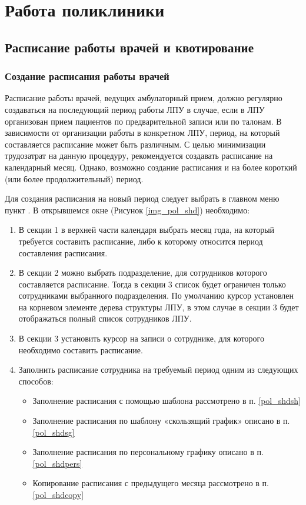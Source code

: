 \newpage
\section{Работа поликлиники}

\subsection{Расписание работы врачей и квотирование}

\subsubsection{Создание расписания работы врачей}

Расписание работы врачей, ведущих амбулаторный прием, должно регулярно создаваться на последующий период работы ЛПУ в случае, если в ЛПУ организован прием пациентов по предварительной записи или по талонам. В зависимости от организации работы в конкретном ЛПУ, период, на который составляется расписание может быть различным. С целью минимизации трудозатрат на данную процедуру, рекомендуется создавать расписание на календарный месяц. Однако, возможно создание расписания и на более короткий (или более продолжительный) период.

Для создания расписания на новый период следует выбрать в главном меню пункт . В открывшемся окне  (Рисунок \ref{img_pol_shd}) необходимо:
\begin{enumerate}
 \item В секции 1 в верхней части календаря выбрать месяц года, на который требуется составить расписание, либо к которому относится период составления расписания.
 \item В секции 2 можно выбрать подразделение, для сотрудников которого составляется расписание. Тогда в секции 3 список будет ограничен только сотрудниками выбранного подразделения. По умолчанию курсор установлен на корневом элементе дерева структуры ЛПУ, в этом случае в секции 3 будет отображаться полный список сотрудников ЛПУ.
 \item В секции 3 установить курсор на записи о сотруднике, для которого необходимо составить расписание.
 \item Заполнить расписание сотрудника на требуемый период одним из следующих способов:
  \begin{itemize}
   	\item Заполнение расписания с помощью шаблона рассмотрено в п. \ref{pol_shdsh}
 	\item Заполнение расписания по шаблону «скользящий график» описано в п. \ref{pol_shdsg}
 	\item Заполнение расписания по персональному графику описано в п. \ref{pol_shdpers}
 	\item Копирование расписания с предыдущего месяца рассмотрено в п. \ref{pol_shdcopy}
  \end{itemize}	
\end{enumerate}


